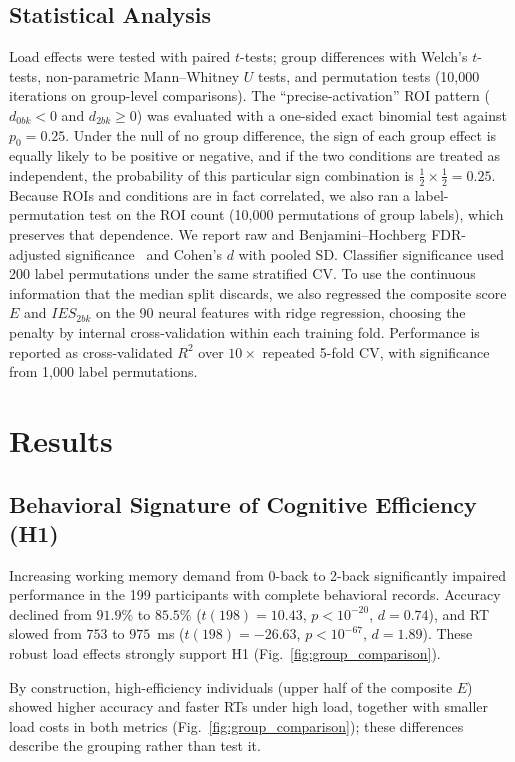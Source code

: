 \documentclass[conference]{IEEEtran}
\begin{document}
\subsection{Statistical Analysis}
Load effects were tested with paired $t$-tests; group differences with Welch's $t$-tests, non-parametric Mann--Whitney $U$ tests, and permutation tests (10{,}000 iterations on group-level comparisons). The ``precise-activation'' ROI pattern ($d_{0bk}<0$ and $d_{2bk}\geq 0$) was evaluated with a one-sided exact binomial test against $p_0=0.25$. Under the null of no group difference, the sign of each group effect is equally likely to be positive or negative, and if the two conditions are treated as independent, the probability of this particular sign combination is $\tfrac{1}{2}\times\tfrac{1}{2}=0.25$. Because ROIs and conditions are in fact correlated, we also ran a label-permutation test on the ROI count (10{,}000 permutations of group labels), which preserves that dependence. We report raw and Benjamini--Hochberg FDR-adjusted significance~\cite{benjamini1995controlling} and Cohen's $d$ with pooled SD. Classifier significance used 200 label permutations under the same stratified CV. To use the continuous information that the median split discards, we also regressed the composite score $E$ and $IES_{2bk}$ on the 90 neural features with ridge regression, choosing the penalty by internal cross-validation within each training fold. Performance is reported as cross-validated $R^2$ over $10\times$ repeated 5-fold CV, with significance from 1{,}000 label permutations.

\section{Results}

\subsection{Behavioral Signature of Cognitive Efficiency (H1)}

Increasing working memory demand from 0-back to 2-back significantly impaired performance in the 199 participants with complete behavioral records. Accuracy declined from $91.9\%$ to $85.5\%$ ($t(198)=10.43$, $p<10^{-20}$, $d=0.74$), and RT slowed from $753$ to $975$~ms ($t(198)=-26.63$, $p<10^{-67}$, $d=1.89$). These robust load effects strongly support H1 (Fig.~\ref{fig:group_comparison}).

By construction, high-efficiency individuals (upper half of the composite $E$) showed higher accuracy and faster RTs under high load, together with smaller load costs in both metrics (Fig.~\ref{fig:group_comparison}); these differences describe the grouping rather than test it.
\end{document}
